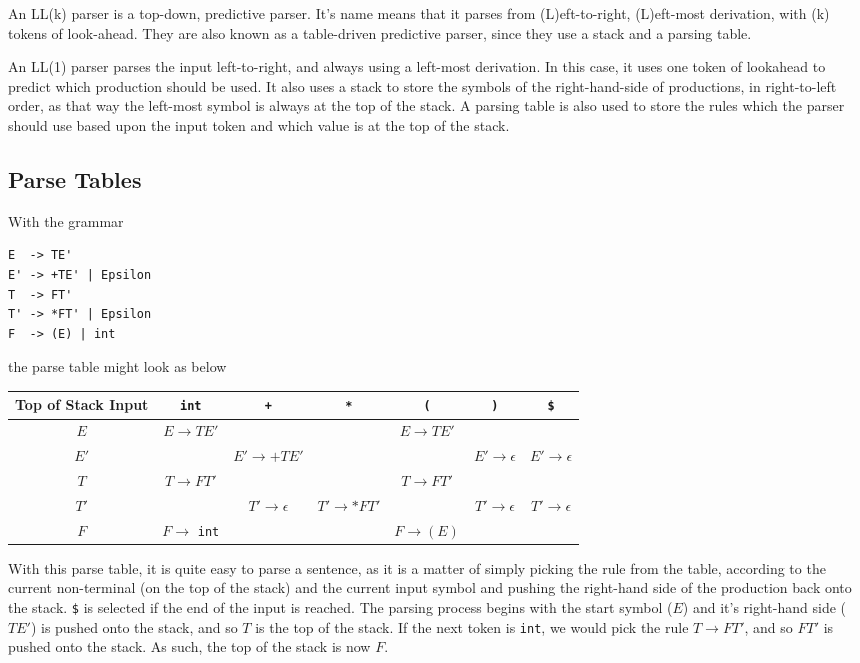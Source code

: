 
An LL(k) parser is a top-down, predictive parser. It's name means that it parses from (L)eft-to-right, (L)eft-most
 derivation, with (k) tokens of look-ahead. They are also known as a table-driven predictive parser, since they use a
 stack and a parsing table.

An LL(1) parser parses the input left-to-right, and always using a left-most derivation. In this case, it uses one token
 of lookahead to predict which production should be used. It also uses a stack to store the symbols of the right-hand-side
 of productions, in right-to-left order, as that way the left-most symbol is always at the top of the stack. A parsing
 table is also used to store the rules which the parser should use based upon the input token and which value is at the
 top of the stack.

\subsection*{Parse Tables}

With the grammar
\begin{verbatim}
E  -> TE'
E' -> +TE' | Epsilon
T  -> FT'
T' -> *FT' | Epsilon
F  -> (E) | int
\end{verbatim}
the parse table might look as below
\begin{table}[h]
  \centering
  \begin{tabular}{ c | c | c | c | c | c | c }
    Top of Stack Input & \verb`int` & \verb`+` & \verb`*` & \verb`(` & \verb`)` & \verb`$` \\
    \hline
    $E$ & $E \rightarrow TE'$ & & & $E \rightarrow TE'$ & & \\
    $E'$ & & $E' \rightarrow +TE'$ & & & $E' \rightarrow \epsilon$ & $E' \rightarrow \epsilon$ \\
    $T$ & $T \rightarrow FT'$ & & & $T \rightarrow FT'$ & & \\
    $T'$ & & $T' \rightarrow \epsilon$ & $T' \rightarrow *FT'$ & & $T' \rightarrow \epsilon $ & $T' \rightarrow \epsilon$ \\
    $F$ & $F \rightarrow$ \verb`int` & & & $F \rightarrow (E)$ & & \\
  \end{tabular}
\end{table}

With this parse table, it is quite easy to parse a sentence, as it is a matter of simply picking the rule from the
 table, according to the current non-terminal (on the top of the stack) and the current input symbol and pushing the
 right-hand side of the production back onto the stack. \verb`$` is selected if the end of the input is reached. The
 parsing process begins with the start symbol ($E$) and it's right-hand side ($TE'$) is pushed onto the stack, and so
 $T$ is the top of the stack. If the next token is \verb`int`, we would pick the rule $T \rightarrow FT'$, and so $FT'$
 is pushed onto the stack. As such, the top of the stack is now $F$.

